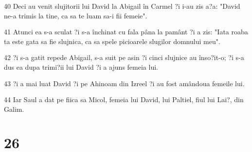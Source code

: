 \par 40 Deci au venit slujitorii lui David la Abigail în Carmel ?i i-au zis a?a: "David ne-a trimis la tine, ca sa te luam sa-i fii femeie".
\par 41 Atunci ea s-a sculat ?i s-a închinat cu fala pâna la pamânt ?i a zis: "Iata roaba ta este gata sa fie slujnica, ca sa spele picioarele slugilor domnului meu".
\par 42 ?i s-a gatit repede Abigail, s-a suit pe asin ?i cinci slujnice au înso?it-o; ?i s-a dus ea dupa trimi?ii lui David ?i a ajuns femeia lui.
\par 43 ?i a mai luat David ?i pe Ahinoam din Izreel ?i au fost amândoua femeile lui.
\par 44 Iar Saul a dat pe fiica sa Micol, femeia lui David, lui Paltiel, fiul lui Lai?, din Galim.

\chapter{26}

